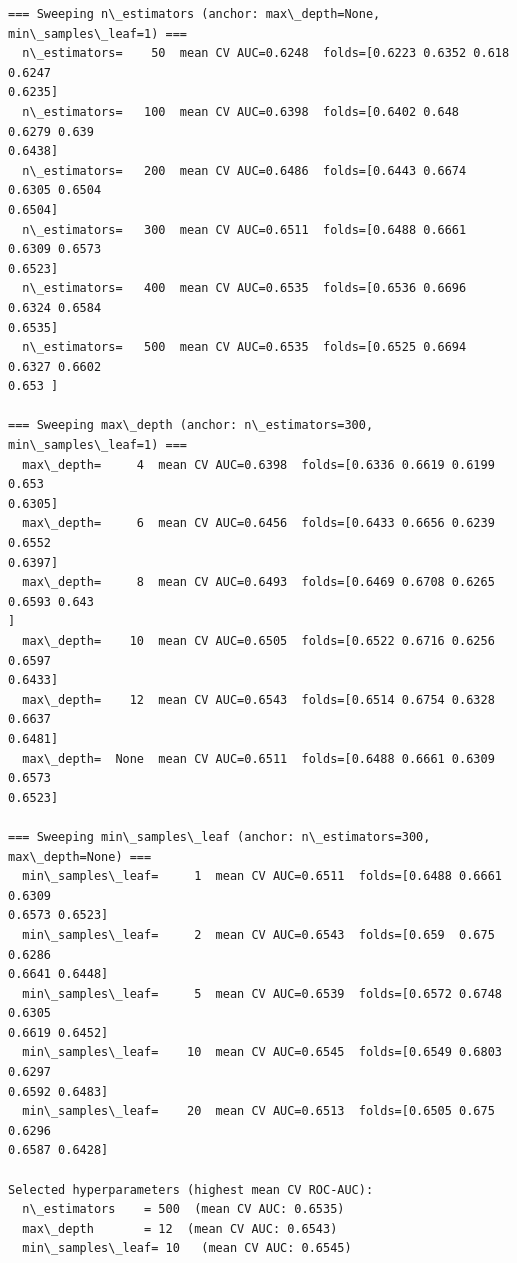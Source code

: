 \documentclass[11pt]{article}
\begin{document}
    \begin{Verbatim}[commandchars=\\\{\}]
=== Sweeping n\_estimators (anchor: max\_depth=None, min\_samples\_leaf=1) ===
  n\_estimators=    50  mean CV AUC=0.6248  folds=[0.6223 0.6352 0.618  0.6247
0.6235]
  n\_estimators=   100  mean CV AUC=0.6398  folds=[0.6402 0.648  0.6279 0.639
0.6438]
  n\_estimators=   200  mean CV AUC=0.6486  folds=[0.6443 0.6674 0.6305 0.6504
0.6504]
  n\_estimators=   300  mean CV AUC=0.6511  folds=[0.6488 0.6661 0.6309 0.6573
0.6523]
  n\_estimators=   400  mean CV AUC=0.6535  folds=[0.6536 0.6696 0.6324 0.6584
0.6535]
  n\_estimators=   500  mean CV AUC=0.6535  folds=[0.6525 0.6694 0.6327 0.6602
0.653 ]

=== Sweeping max\_depth (anchor: n\_estimators=300, min\_samples\_leaf=1) ===
  max\_depth=     4  mean CV AUC=0.6398  folds=[0.6336 0.6619 0.6199 0.653
0.6305]
  max\_depth=     6  mean CV AUC=0.6456  folds=[0.6433 0.6656 0.6239 0.6552
0.6397]
  max\_depth=     8  mean CV AUC=0.6493  folds=[0.6469 0.6708 0.6265 0.6593 0.643
]
  max\_depth=    10  mean CV AUC=0.6505  folds=[0.6522 0.6716 0.6256 0.6597
0.6433]
  max\_depth=    12  mean CV AUC=0.6543  folds=[0.6514 0.6754 0.6328 0.6637
0.6481]
  max\_depth=  None  mean CV AUC=0.6511  folds=[0.6488 0.6661 0.6309 0.6573
0.6523]

=== Sweeping min\_samples\_leaf (anchor: n\_estimators=300, max\_depth=None) ===
  min\_samples\_leaf=     1  mean CV AUC=0.6511  folds=[0.6488 0.6661 0.6309
0.6573 0.6523]
  min\_samples\_leaf=     2  mean CV AUC=0.6543  folds=[0.659  0.675  0.6286
0.6641 0.6448]
  min\_samples\_leaf=     5  mean CV AUC=0.6539  folds=[0.6572 0.6748 0.6305
0.6619 0.6452]
  min\_samples\_leaf=    10  mean CV AUC=0.6545  folds=[0.6549 0.6803 0.6297
0.6592 0.6483]
  min\_samples\_leaf=    20  mean CV AUC=0.6513  folds=[0.6505 0.675  0.6296
0.6587 0.6428]

Selected hyperparameters (highest mean CV ROC-AUC):
  n\_estimators    = 500  (mean CV AUC: 0.6535)
  max\_depth       = 12  (mean CV AUC: 0.6543)
  min\_samples\_leaf= 10   (mean CV AUC: 0.6545)
    \end{Verbatim}
\end{document}
